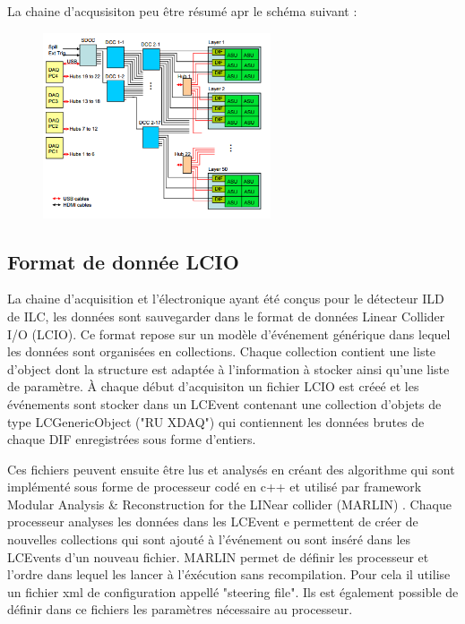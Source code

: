 La chaine d'acqusisiton peu être résumé apr le schéma suivant : 
\begin{figure}[h!]
	\centering
	\includegraphics[width=0.6\textwidth]{GLA/chaine.png}
\end{figure}

\subsection{Format de donnée LCIO}
La chaine d'acquisition et l'électronique ayant été conçus pour le détecteur ILD de ILC, les données sont sauvegarder dans le format de données Linear Collider I/O (LCIO)\cite{2003physics6114G}. Ce format repose sur un modèle d'événement générique  dans lequel les données sont organisées en collections. Chaque collection contient une liste d'object dont la structure est adaptée à l'information à stocker ainsi qu'une liste de paramètre. À chaque début d'acquisiton un fichier LCIO est créeé et les événements sont stocker dans un LCEvent contenant une collection d'objets de type LCGenericObject ("RU XDAQ") qui contiennent les données brutes de chaque DIF enregistrées sous forme d'entiers.

Ces fichiers peuvent ensuite être lus et analysés en créant des algorithme qui sont implémenté sous forme de processeur codé en c++ et utilisé par framework Modular Analysis \& Reconstruction for the LINear collider (MARLIN) \cite{Gaede:2006pj}. Chaque processeur analyses les données dans les LCEvent e permettent de créer de nouvelles collections qui sont ajouté à l'événement ou sont inséré dans les LCEvents d'un nouveau fichier. MARLIN permet de définir les processeur et l'ordre dans lequel les lancer à l'éxécution sans recompilation. Pour cela il utilise un fichier xml de configuration appellé "steering file". Ils est également possible de définir dans ce fichiers les paramètres nécessaire au processeur.

